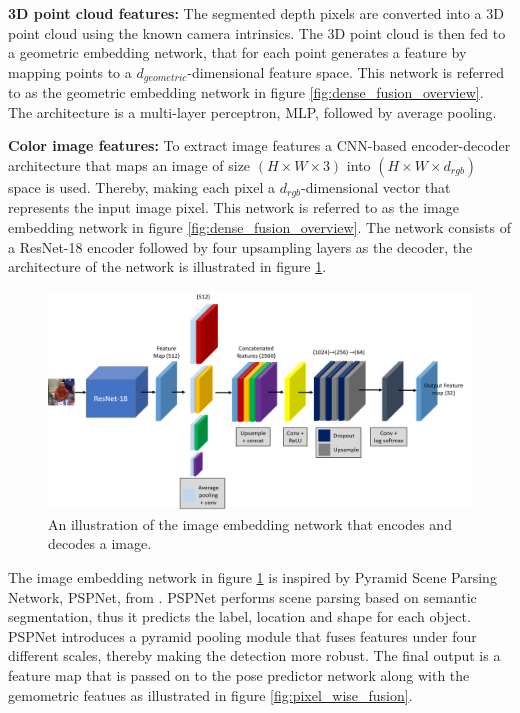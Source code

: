 \documentclass[../main.tex]{subfiles}
\begin{document}
\textbf{3D point cloud features:} The segmented depth pixels are converted into a 3D point cloud using the known camera intrinsics. The 3D point cloud is then fed to a geometric embedding network, that for each point generates a feature by mapping points to a $d_{geometric}$-dimensional feature space. This network is referred to as the geometric embedding network in figure \ref{fig:dense_fusion_overview}. The architecture is a multi-layer perceptron, MLP, followed by average pooling.

\textbf{Color image features:} To extract image features a CNN-based encoder-decoder architecture that maps an image of size $(H \times W \times 3)$ into $(H \times W \times d_{rgb})$ space is used. Thereby, making each pixel a $d_{rgb}$-dimensional vector that represents the input image pixel. This network is referred to as the image embedding network in figure \ref{fig:dense_fusion_overview}. The network consists of a ResNet-18 \cite{resnet} encoder followed by four upsampling layers as the decoder, the architecture of the network is illustrated in figure \ref{fig:image_embedding_network}.

\begin{figure}[H]
    \centering
    \includegraphics[width=\textwidth]{figures/dense_fusion/pspnet_architecture.png}
    \caption{An illustration of the image embedding network that encodes and decodes a image.}
    \label{fig:image_embedding_network}
\end{figure}

The image embedding network in figure \ref{fig:image_embedding_network} is inspired by Pyramid Scene Parsing Network, PSPNet, from \cite{pspnet}. PSPNet performs scene parsing based on semantic segmentation, thus it predicts the label, location and shape for each object. PSPNet introduces a pyramid pooling module that fuses features under four different scales, thereby making the detection more robust. The final output is a feature map that is passed on to the pose predictor network along with the gemometric featues as illustrated in figure \ref{fig:pixel_wise_fusion}.
\end{document}
